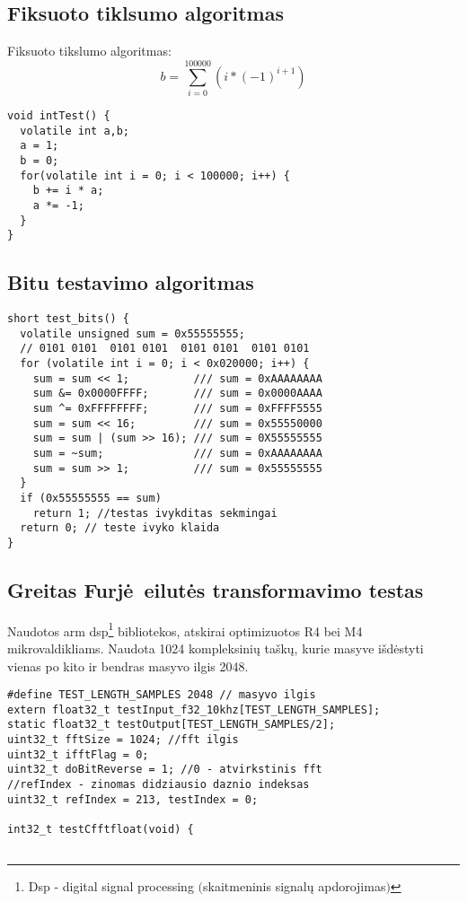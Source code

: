 \documentclass[a4paper, 12pt]{article} %
\begin{document}
\begin{onehalfspacing}
\subsection{Fiksuoto tiklsumo algoritmas}
Fiksuoto tikslumo algoritmas:
\begin{equation}
b = \sum_{i=0}^{100000} (i * (-1)^{i+1})
\end{equation}

\begin{verbatim}
void intTest() {
  volatile int a,b;
  a = 1;
  b = 0;
  for(volatile int i = 0; i < 100000; i++) {
    b += i * a;
    a *= -1;
  }
}
\end{verbatim}
\subsection{Bitu testavimo algoritmas}
\begin{verbatim}
short test_bits() {
  volatile unsigned sum = 0x55555555; 
  // 0101 0101  0101 0101  0101 0101  0101 0101  
  for (volatile int i = 0; i < 0x020000; i++) {
    sum = sum << 1;          /// sum = 0xAAAAAAAA 
    sum &= 0x0000FFFF;       /// sum = 0x0000AAAA
    sum ^= 0xFFFFFFFF;       /// sum = 0xFFFF5555
    sum = sum << 16;         /// sum = 0x55550000
    sum = sum | (sum >> 16); /// sum = 0X55555555
    sum = ~sum;              /// sum = 0xAAAAAAAA
    sum = sum >> 1;          /// sum = 0x55555555
  }
  if (0x55555555 == sum)
    return 1; //testas ivykditas sekmingai
  return 0; // teste ivyko klaida
}
\end{verbatim}
\subsection{Greitas Furj\.e\ eilut\.es transformavimo testas}
Naudotos arm dsp\footnote{Dsp - digital signal processing $($skaitmeninis signal\k{u} apdorojimas$)$} bibliotekos, atskirai optimizuotos R4 bei M4 mikrovaldikliams. Naudota 1024 kompleksini\k{u} ta\v{s}k\k{u}, kurie masyve i\v{s}d\.estyti vienas po kito ir bendras masyvo ilgis 2048. %
\begin{verbatim}
#define TEST_LENGTH_SAMPLES 2048 // masyvo ilgis
extern float32_t testInput_f32_10khz[TEST_LENGTH_SAMPLES]; 
static float32_t testOutput[TEST_LENGTH_SAMPLES/2]; 
uint32_t fftSize = 1024; //fft ilgis
uint32_t ifftFlag = 0; 
uint32_t doBitReverse = 1; //0 - atvirkstinis fft
//refIndex - zinomas didziausio daznio indeksas
uint32_t refIndex = 213, testIndex = 0;

int32_t testCfftfloat(void) { 
   

\end{verbatim}
\end{onehalfspacing}
\end{document}
